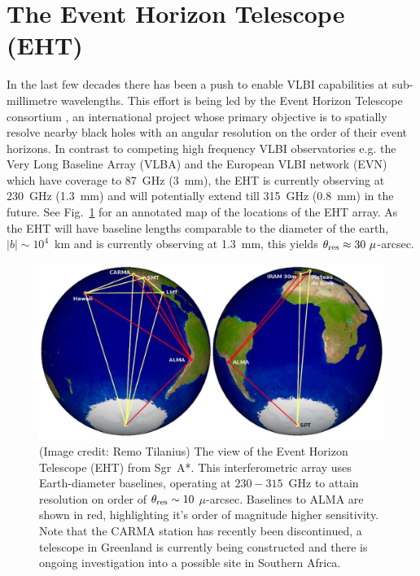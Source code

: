 \section{The Event Horizon Telescope (EHT)}

In the last few decades there has been a push to enable VLBI capabilities at sub-millimetre wavelengths. This effort is being led by the Event Horizon Telescope consortium \citep[(EHT),][]{Doeleman_2010}, an international project whose primary objective is to spatially resolve nearby black holes with an angular resolution on the order of their event horizons. In contrast to competing high frequency VLBI observatories e.g. the Very Long Baseline Array (VLBA) and the European VLBI network (EVN) which have coverage to 87~GHz (3~mm), the EHT is currently observing at 230~GHz (1.3~mm) and will potentially extend till 315~GHz (0.8~mm) in the future. See Fig.~\ref{fig:eht_globe} for an annotated map of the locations of the EHT array. As the EHT will have baseline lengths comparable to the diameter of the earth, $|b| \sim 10^4$~km and is currently observing at 1.3~mm, this yields $\theta_{\rm res} \approx 30\ \mu$-arcsec.

\begin{figure}
\begin{center}
\includegraphics[width=0.8\columnwidth]{Images/eht_globe}
\caption{(Image credit: Remo Tilanius) The view of the Event Horizon Telescope (EHT) from Sgr~A*. This interferometric array uses Earth-diameter baselines, operating at $230-315$~GHz to attain resolution on order of $\theta_{\rm res} \sim 10$ $\mu$-arcsec. Baselines to ALMA are shown in red, highlighting it's order of magnitude higher sensitivity. Note that the CARMA station has recently been discontinued, a telescope in Greenland is currently being constructed and there is ongoing investigation into a possible site in Southern Africa.\label{fig:eht_globe}%
}
\end{center}
\end{figure}

